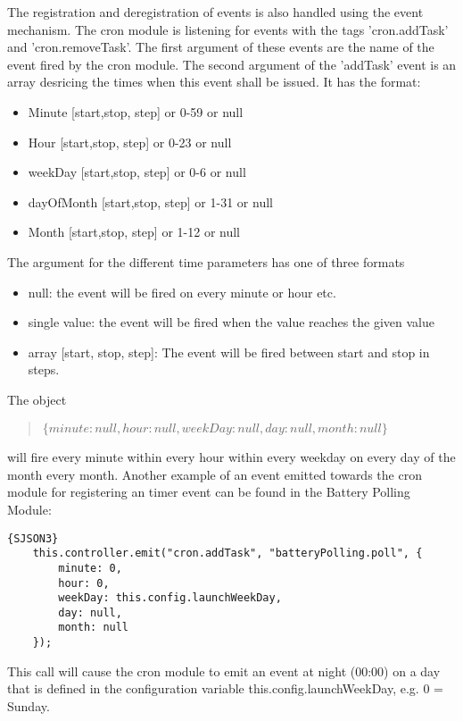 The registration and deregistration of events is also handled using the event mechanism. 
The cron module is listening for events with the tags 'cron.addTask' and  'cron.removeTask'. 
The first argument of these events are the name of the event fired by the cron module. The 
second argument of the 'addTask' event is an array desricing the times when this event shall be issued. It has the format: 
\begin{itemize}
\item Minute [start,stop, step] or 0-59 or null
\item Hour [start,stop, step] or 0-23 or null
\item weekDay [start,stop, step] or 0-6 or null
\item dayOfMonth [start,stop, step] or 1-31 or null
\item Month [start,stop, step] or 1-12 or null
\end{itemize}
The argument for the different time parameters has one of three formats
\begin{itemize}
\item null: the event will be fired on every minute or hour etc.
\item single value: the event will be fired when the value reaches the given value
\item array [start, stop, step]: The event will be fired between start and stop in steps.
\end{itemize}
 
 The object  
\begin{quote}
{\tt  $\{minute: null,hour: null,weekDay: null, day: null, month: null\} $   }
\end{quote} 

will fire every minute within every hour within every weekday on every day of the month every month. Another example of an event emitted towards the cron 
module for registering an timer event can be found in the Battery Polling Module:

\begin{lstlisting}[caption=Registering a Battery Polling Command]{SJSON3}
    this.controller.emit("cron.addTask", "batteryPolling.poll", {
        minute: 0,
        hour: 0,
        weekDay: this.config.launchWeekDay,
        day: null,
        month: null        
    });
\end{lstlisting}

This call will cause the cron module to emit an event at night (00:00) on a day 
that is defined in the configuration variable this.config.launchWeekDay, e.g. 0 = Sunday.

